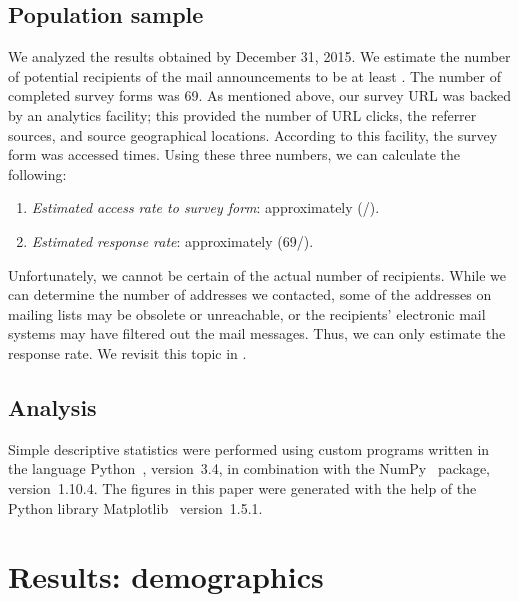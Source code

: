 \documentclass{casicswhitepaper}
\newcommand{\totalRespondents}{69\xspace}
\begin{document}
\subsection{Population sample}
\label{population-sample}

We analyzed the results obtained by December 31, 2015.  We estimate the number of potential recipients of the mail announcements to be at least \totalPotentialRecipients.  The number of completed survey forms was \totalRespondents.  As mentioned above, our survey URL was backed by an analytics facility; this provided the number of URL clicks, the referrer sources, and source geographical locations.  According to this facility, the survey form was accessed \totalClicks times.  Using these three numbers, we can calculate the following:

\begin{enumerate}[itemsep=-0.5ex]

\item \emph{Estimated access rate to survey form}: approximately \accessRate  (\totalClicks/\totalPotentialRecipients).

\item \emph{Estimated response rate}: approximately \populationResponseRate (\totalRespondents/\totalPotentialRecipients).

\end{enumerate}

Unfortunately, we cannot be certain of the actual number of recipients.  While we can determine the number of addresses we contacted, some of the addresses on mailing lists may be obsolete or unreachable, or the recipients' electronic mail systems may have filtered out the mail messages.  Thus, we can only estimate the response rate.  We revisit this topic in  .


\subsection{Analysis}

Simple descriptive statistics were performed using custom programs written in the language Python~\cite{vanRossum1991interactively, perez2011python}, version~3.4, in combination with the NumPy~\cite{vanderwalt2011numpy} package, version~1.10.4.  The figures in this paper were generated with the help of the Python library Matplotlib~\cite{hunter2007matplotlib} version~1.5.1.


\clearpage

\section{Results: demographics}
\label{demographics}
\end{document}
